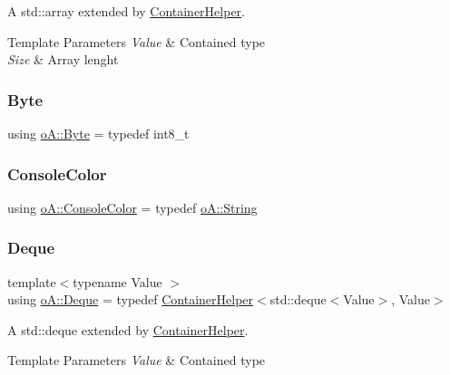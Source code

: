 A std\+::array extended by \mbox{\hyperlink{classo_a_1_1_container_helper}{Container\+Helper}}. 


\begin{DoxyTemplParams}{Template Parameters}
{\em Value} & Contained type \\
\hline
{\em Size} & Array lenght \\
\hline
\end{DoxyTemplParams}
\mbox{\label{namespaceo_a_a2b99671898a8eb4bc6ab35036701d732}} 
\subsubsection{\texorpdfstring{Byte}{Byte}}
{\footnotesize\ttfamily using \mbox{\hyperlink{namespaceo_a_a2b99671898a8eb4bc6ab35036701d732}{o\+A\+::\+Byte}} = typedef int8\+\_\+t}

\mbox{\label{namespaceo_a_a747e07c1977a29f3e1d38683043ec927}} 
\subsubsection{\texorpdfstring{Console\+Color}{ConsoleColor}}
{\footnotesize\ttfamily using \mbox{\hyperlink{namespaceo_a_a747e07c1977a29f3e1d38683043ec927}{o\+A\+::\+Console\+Color}} = typedef \mbox{\hyperlink{classo_a_1_1_string}{o\+A\+::\+String}}}

\mbox{\label{namespaceo_a_a3ac69d4df0d84ed5c8aa6dd69547497d}} 
\subsubsection{\texorpdfstring{Deque}{Deque}}
{\footnotesize\ttfamily template$<$typename Value $>$ \\
using \mbox{\hyperlink{namespaceo_a_a3ac69d4df0d84ed5c8aa6dd69547497d}{o\+A\+::\+Deque}} = typedef \mbox{\hyperlink{classo_a_1_1_container_helper}{Container\+Helper}}$<$std\+::deque$<$Value$>$, Value$>$}



A std\+::deque extended by \mbox{\hyperlink{classo_a_1_1_container_helper}{Container\+Helper}}. 


\begin{DoxyTemplParams}{Template Parameters}
{\em Value} & Contained type \\
\hline
\end{DoxyTemplParams}
\mbox{\label{namespaceo_a_a2bcc976232176d2dcf8b9df1fa33c038}} 

